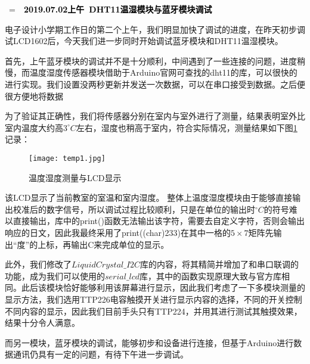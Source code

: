 \documentclass[a4paper, 11pt]{article} %
\makeatletter
\newlength\sidebar
\newlength\envborder
\def\esefcolorbox#1#{\esecolor@fbox{#1}}
\def\esecolor@fbox#1#2#3{%
   \color@b@x{\fboxsep\z@\color#1{#2}\fboxs}{\color#1{#3}}}
\newenvironment{eseframed}{%
   \def\FrameCommand{\fboxrule=\the\sidebar  \fboxsep=\the\envborder%
   \esefcolorbox{exampleborder}{examplebg}}%
   \MakeFramed{\FrameRestore}}%
  {\endMakeFramed}
\newcounter{diary}
\newenvironment{diary}[2]
 {\par\medskip\refstepcounter{diary}%
 \hbox{%
 \fboxsep=\the\sidebar\hspace{-\envborder}\hspace{-0.5\sidebar}%
 \colorbox{exampleborder}{%
 \hspace{\envborder}\footnotesize\sffamily\bfseries%
 \textcolor{black}{{#1}\ {#2}\enspace\hspace{\envborder}}
 }
 }
 \nointerlineskip\vspace{-\topsep}%
 \begin{eseframed}\noindent\ignorespaces%
 }
 {\end{eseframed}\vspace{-\baselineskip}\medskip}
\makeatother
\begin{document}
\begin{diary}{2019.07.02上午}{DHT11温湿模块与蓝牙模块调试}
\par{}电子设计小学期工作日的第二个上午，我们明显加快了调试的进度，在昨天初步调试LCD1602后，今天我们进一步同时开始调试蓝牙模块和DHT11温湿模块。

首先，上午蓝牙模块的调试并不是十分顺利，中间遇到了一些连接的问题，进度稍慢，而温度湿度传感器模块借助于Arduino官网可查找的dht11的库，可以很快的进行实现。我们设置没两秒更新并发送一次数据，可以在串口接受到数据。之后便很方便地将数据

为了验证其正确性，我们将传感器分别在室内与室外进行了测量，结果表明室外比室内温度大约高$3^\circ C$左右，湿度也稍高于室内，符合实际情况，测量结果如下图\ref{img1}记录：
\begin{figure}[H]
  \centering
  \texttt{[image: temp1.jpg]}
  \caption{温度湿度测量与LCD显示}
  \label{img1}
\end{figure}

该LCD显示了当前教室的室温和室内湿度。
整体上温度湿度模块由于能够直接输出校准后的数字信号，所以调试过程比较顺利，只是在单位的输出时$^{\circ}C$的符号难以直接输出，库中的print()函数无法输出该字符，需要去自定义字符，否则会输出响应的日文，因此我最终采用了print((char)233)在其中一格的$5\times 7$矩阵先输出“度”的上标，再输出C来完成单位的显示。

此外，我们修改了$LiquidCrystal\_I2C$库的内容，将其精简并增加了和串口联调的功能，成为我们可以使用的$serial\_lcd$库，其中的函数实现原理大致与官方库相同。此后该模块恰好能够利用该屏幕进行显示，因此我们考虑了一下多模块测量的显示方法，我们选用TTP226电容触摸开关进行显示内容的选择，不同的开关控制不同内容的显示，因此我们目前手头只有TTP224，并用其进行测试其触摸效果，结果十分令人满意。

而另一模块，蓝牙模块的调试，能够初步和设备进行连接，但基于Arduino进行数据通讯仍具有一定的问题，有待下午进一步调试。

\end{diary}
\end{document}
